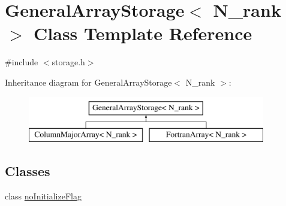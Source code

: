 \hypertarget{classGeneralArrayStorage}{}\section{General\+Array\+Storage$<$ N\+\_\+rank $>$ Class Template Reference}
\label{classGeneralArrayStorage}


{\ttfamily \#include $<$storage.\+h$>$}

Inheritance diagram for General\+Array\+Storage$<$ N\+\_\+rank $>$\+:\begin{figure}[H]
\begin{center}
\leavevmode
\includegraphics[height=2.000000cm]{classGeneralArrayStorage}
\end{center}
\end{figure}
\subsection*{Classes}
\begin{DoxyCompactItemize}
\item 
class \hyperlink{classGeneralArrayStorage_1_1noInitializeFlag}{no\+Initialize\+Flag}
\end{DoxyCompactItemize}
